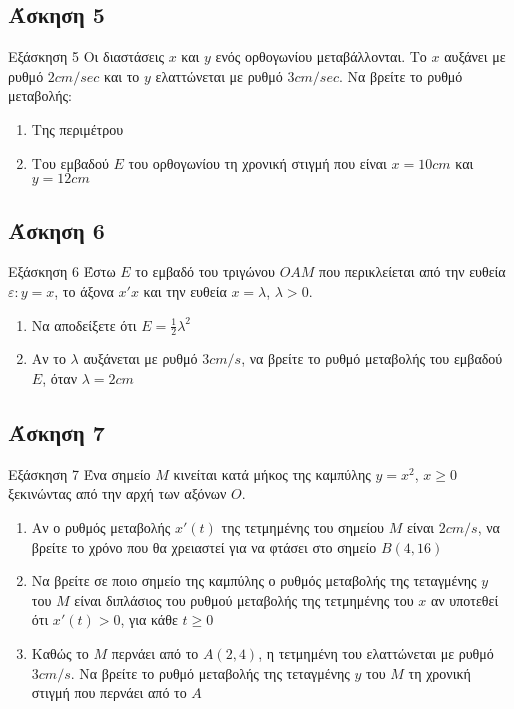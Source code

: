 \documentclass[greek]{beamer}
\begin{document}
\subsection{Άσκηση 5}
\begin{frame}[label=Άσκηση5]{Εξάσκηση 5}
  Οι διαστάσεις $x$ και $y$ ενός ορθογωνίου μεταβάλλονται. Το $x$ αυξάνει με ρυθμό $2cm/sec$ και το $y$ ελαττώνεται με ρυθμό $3cm/sec$. Να βρείτε το ρυθμό μεταβολής:
  \begin{enumerate}
    \item<1-> Της περιμέτρου
    \item<2-> Του εμβαδού $Ε$ του ορθογωνίου τη χρονική στιγμή που είναι $x=10cm$ και $y=12cm$
  \end{enumerate}

\end{frame}

\subsection{Άσκηση 6}
\begin{frame}[label=Άσκηση6]{Εξάσκηση 6}
  Έστω $Ε$ το εμβαδό του τριγώνου $ΟΑΜ$ που περικλείεται από την ευθεία $ε:y=x$, το άξονα $x'x$ και την ευθεία $x=λ$, $λ>0$.
  \begin{enumerate}
    \item<1-> Να αποδείξετε ότι $Ε=\frac{1}{2}λ^2$
    \item<2-> Αν το $λ$ αυξάνεται με ρυθμό $3cm/s$, να βρείτε το ρυθμό μεταβολής του εμβαδού $Ε$, όταν $λ=2cm$
  \end{enumerate}

\end{frame}

\subsection{Άσκηση 7}
\begin{frame}[label=Άσκηση7]{Εξάσκηση 7}
  Ένα σημείο $Μ$ κινείται κατά μήκος της καμπύλης $y=x^2$, $x\ge0$ ξεκινώντας από την αρχή των αξόνων $Ο$.
  \begin{enumerate}
    \item<1-> Αν ο ρυθμός μεταβολής $x'(t)$ της τετμημένης του σημείου $Μ$ είναι $2cm/s$, να βρείτε το χρόνο που θα χρειαστεί για να φτάσει στο σημείο $Β(4,16)$
    \item<2-> Να βρείτε σε ποιο σημείο της καμπύλης ο ρυθμός μεταβολής της τεταγμένης $y$ του $Μ$ είναι διπλάσιος του ρυθμού μεταβολής της τετμημένης του $x$ αν υποτεθεί ότι $x'(t)>0$, για κάθε $t\ge0$
    \item<3-> Καθώς το $Μ$ περνάει από το $Α(2,4)$, η τετμημένη του ελαττώνεται με ρυθμό $3cm/s$. Να βρείτε το ρυθμό μεταβολής της τεταγμένης $y$ του $Μ$ τη χρονική στιγμή που περνάει από το $Α$
  \end{enumerate}

\end{frame}
\end{document}
